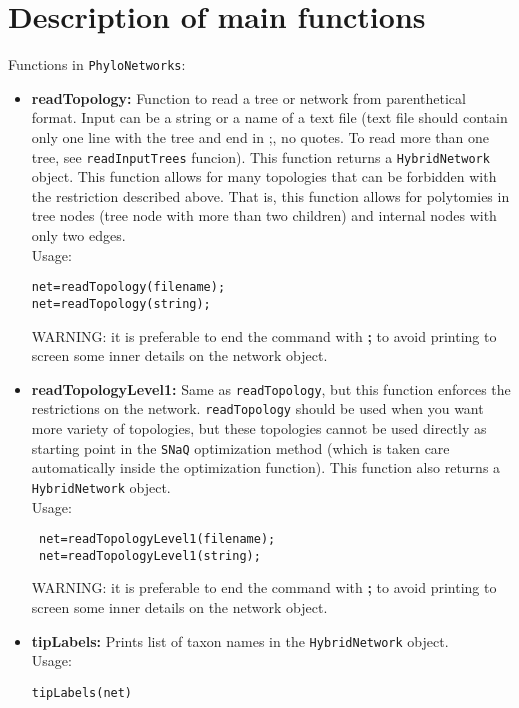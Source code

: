 \documentclass[12pt]{article}
\begin{document}
\section{Description of main functions}
Functions in \texttt{PhyloNetworks}:
\begin{itemize}
\item \textbf{readTopology:} Function to read a tree or network from
  parenthetical format. Input can be a string or a name of a text file
  (text file should contain only one line with the tree and end in ;,
  no quotes. To read more than one tree, see \texttt{readInputTrees}
  funcion). This function returns a \texttt{HybridNetwork} object. This
  function allows for many topologies that can be forbidden with the
  restriction described above. That is, this function allows for
  polytomies in tree nodes (tree node with more than two children) and
  internal nodes with only two edges. \
\\Usage:
\begin{lstlisting}
net=readTopology(filename);
net=readTopology(string);
\end{lstlisting}
WARNING: it is preferable to end the command with \textbf{;} to avoid
printing to screen some inner details on the network object.


\item \textbf{readTopologyLevel1:} Same as \texttt{readTopology}, but
  this function enforces the restrictions on the network. \texttt{readTopology}
  should be used when you want more variety of topologies, but these
  topologies cannot be used directly as starting point in the
  \texttt{SNaQ} optimization method (which is taken care automatically
  inside the optimization function). This
  function also returns a \texttt{HybridNetwork} object. \\
  Usage:
\begin{lstlisting}
 net=readTopologyLevel1(filename);
 net=readTopologyLevel1(string);
\end{lstlisting}
WARNING: it is preferable to end the command with \textbf{;} to avoid
printing to screen some inner details on the network object.


\item \textbf{tipLabels:} Prints list of taxon names in the \texttt{HybridNetwork}
  object.\\
Usage:
\begin{lstlisting}
tipLabels(net)
\end{lstlisting}


\end{itemize}
\end{document}
